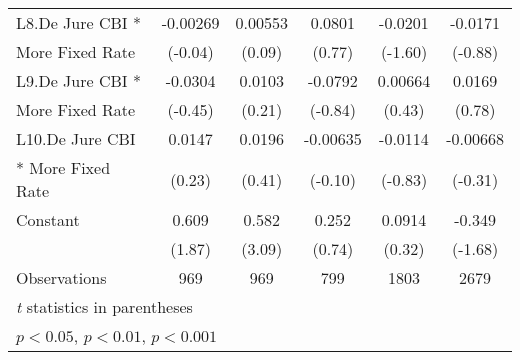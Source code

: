 {\begin{tabular}{l*{5}{c}}
\addlinespace
L8.De Jure CBI *& -0.00269         &  0.00553         &   0.0801         &  -0.0201         &  -0.0171         \\
More Fixed Rate &  (-0.04)         &   (0.09)         &   (0.77)         &  (-1.60)         &  (-0.88)         \\
\addlinespace
L9.De Jure CBI *&  -0.0304         &   0.0103         &  -0.0792         &  0.00664         &   0.0169         \\
More Fixed Rate &  (-0.45)         &   (0.21)         &  (-0.84)         &   (0.43)         &   (0.78)         \\
\addlinespace
L10.De Jure CBI &   0.0147         &   0.0196         & -0.00635         &  -0.0114         & -0.00668         \\
* More Fixed Rate&   (0.23)         &   (0.41)         &  (-0.10)         &  (-0.83)         &  (-0.31)         \\
\addlinespace
Constant        &    0.609         &    0.582\sym{**} &    0.252         &   0.0914         &   -0.349         \\
                &   (1.87)         &   (3.09)         &   (0.74)         &   (0.32)         &  (-1.68)         \\
\midrule
Observations    &      969         &      969         &      799         &     1803         &     2679         \\
\bottomrule
\multicolumn{6}{l}{\footnotesize \textit{t} statistics in parentheses}\\
\multicolumn{6}{l}{\footnotesize \sym{*} \(p<0.05\), \sym{**} \(p<0.01\), \sym{***} \(p<0.001\)}\\
\end{tabular}
}

